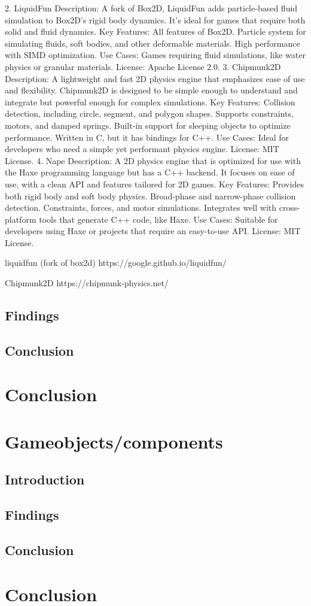\documentclass{projdoc}
\begin{document}
2. LiquidFun
Description: A fork of Box2D, LiquidFun adds particle-based fluid simulation to Box2D's rigid body dynamics. It's ideal for games that require both solid and fluid dynamics.
Key Features:
All features of Box2D.
Particle system for simulating fluids, soft bodies, and other deformable materials.
High performance with SIMD optimization.
Use Cases: Games requiring fluid simulations, like water physics or granular materials.
License: Apache License 2.0.
3. Chipmunk2D
Description: A lightweight and fast 2D physics engine that emphasizes ease of use and flexibility. Chipmunk2D is designed to be simple enough to understand and integrate but powerful enough for complex simulations.
Key Features:
Collision detection, including circle, segment, and polygon shapes.
Supports constraints, motors, and damped springs.
Built-in support for sleeping objects to optimize performance.
Written in C, but it has bindings for C++.
Use Cases: Ideal for developers who need a simple yet performant physics engine.
License: MIT License.
4. Nape
Description: A 2D physics engine that is optimized for use with the Haxe programming language but has a C++ backend. It focuses on ease of use, with a clean API and features tailored for 2D games.
Key Features:
Provides both rigid body and soft body physics.
Broad-phase and narrow-phase collision detection.
Constraints, forces, and motor simulations.
Integrates well with cross-platform tools that generate C++ code, like Haxe.
Use Cases: Suitable for developers using Haxe or projects that require an easy-to-use API.
License: MIT License.

liquidfun (fork of box2d)
https://google.github.io/liquidfun/

Chipmunk2D
https://chipmunk-physics.net/


\subsection{Findings}

\subsection{Conclusion}

\section{Conclusion}

\section{Gameobjects/components}

\subsection{Introduction}

\subsection{Findings}

\subsection{Conclusion}

\section{Conclusion}
\end{document}

